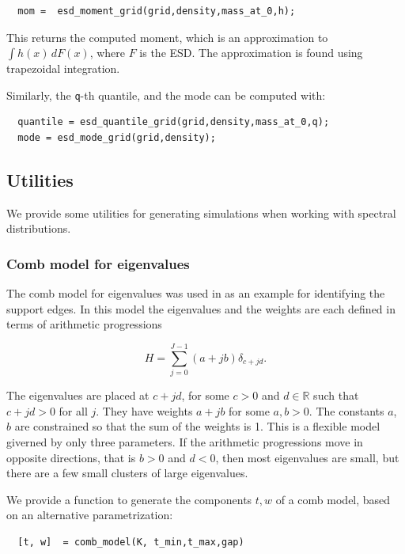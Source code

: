 \documentclass[english,11pt]{article} %
\begin{document}
\begin{verbatim}
  mom =  esd_moment_grid(grid,density,mass_at_0,h);
\end{verbatim}

This returns the computed moment, which is an approximation to $\int h(x)\, dF(x)$, where $F$ is the ESD. The approximation is found using trapezoidal integration.

Similarly, the \verb+q+-th quantile, and the mode can be computed with: 

\begin{verbatim}
  quantile = esd_quantile_grid(grid,density,mass_at_0,q);
  mode = esd_mode_grid(grid,density);
\end{verbatim}

\subsection{Utilities}

We provide some utilities for generating simulations  when working with spectral distributions. 

\subsubsection{Comb model for eigenvalues}

The comb model for eigenvalues was used in \cite{dobriban2015efficient} as an example for identifying the support edges. In this model the eigenvalues and the weights are each defined in terms of arithmetic progressions

\begin{equation*}
\label{Comb_model}
H = \sum_{j=0}^{J-1} (a + jb) \delta_{c+jd}.
\end{equation*}


The eigenvalues are placed at $c+jd$, for some $c>0$ and $d \in \mathbb{R}$ such that $c+jd>0$ for all $j$. They have weights $a + jb$ for some $a,b>0$. The constants $a$, $b$ are constrained so that the sum of the weights is 1. This is a flexible model giverned by only three parameters. If the arithmetic progressions move in opposite directions, that is $b>0$ and $d<0$, then most eigenvalues are small, but there are a few small clusters of large eigenvalues.

We provide a function to generate the components $t,w$ of a comb model, based on an alternative parametrization:

\begin{verbatim}
  [t, w]  = comb_model(K, t_min,t_max,gap)
\end{verbatim}
\end{document}
